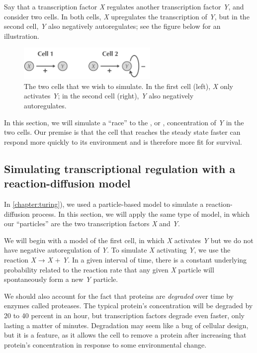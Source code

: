 Say that a transcription factor \textit{X} regulates another transcription factor \textit{Y}, and consider two cells. In both cells, \textit{X} upregulates the transcription of \textit{Y}, but in the second cell, \textit{Y} also negatively autoregulates; see the figure below for an illustration.

\begin{figure}[h]
\centering
\mySfFamily
\includegraphics[width = 0.6\textwidth]{../images/two_cells.png}
\caption{The two cells that we wish to simulate. In the first cell (left), \textit{X} only activates \textit{Y}; in the second cell (right), \textit{Y} also negatively autoregulates.}
\label{fig:two_cells}
\end{figure}

In this section, we will simulate a ``race'' to the , or , concentration of \textit{Y} in the two cells. Our premise is that the cell that reaches the steady state faster can respond more quickly to its environment and is therefore more fit for survival.

\FloatBarrier
{}
\subsection{Simulating transcriptional regulation with a reaction-diffusion model}

In \autoref{chapter:turing}), we used a particle-based model to simulate a reaction-diffusion process. In this section, we will apply the same type of model, in which our ``particles'' are the two transcription factors \textit{X} and \textit{Y}.

We will begin with a model of the first cell, in which \textit{X} activates \textit{Y} but we do not have negative autoregulation of \textit{Y}. To simulate \textit{X} activating \textit{Y}, we use the reaction \textit{X} → \textit{X} + \textit{Y}. In a given interval of time, there is a constant underlying probability related to the reaction rate that any given \textit{X} particle will spontaneously form a new \textit{Y} particle.

We should also account for the fact that proteins are \textit{degraded} over time by enzymes called proteases. The typical protein's concentration will be degraded by 20 to 40 percent in an hour, but transcription factors degrade even faster, only lasting a matter of minutes. Degradation may seem like a bug of cellular design, but it is a feature, as it allows the cell to remove a protein after increasing that protein's concentration in response to some environmental change.

